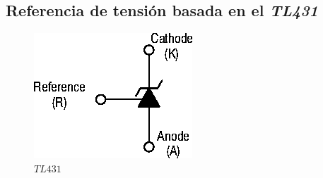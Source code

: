 
\subsection{Referencia de tensión basada en el \textit{TL431}}

\label{section:voltage_reference}


\begin{figure}
\begin{center}
\includegraphics[width=0.15 \textwidth, angle=0]{./img/voltage_reference/reference0.png}
\end{center}
\caption{\label{fig:fig_vref_cir_0}\footnotesize{$TL431$}}
\end{figure}


